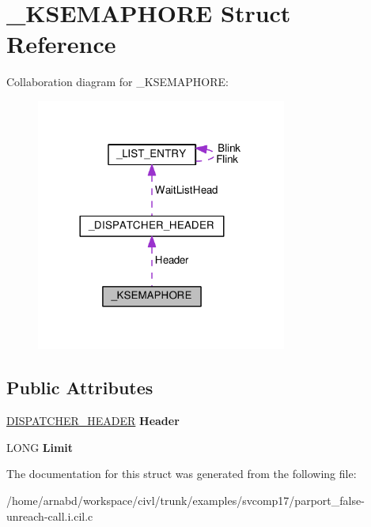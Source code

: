\hypertarget{struct__KSEMAPHORE}{}\section{\+\_\+\+K\+S\+E\+M\+A\+P\+H\+O\+R\+E Struct Reference}
\label{struct__KSEMAPHORE}


Collaboration diagram for \+\_\+\+K\+S\+E\+M\+A\+P\+H\+O\+R\+E\+:
\nopagebreak
\begin{figure}[H]
\begin{center}
\leavevmode
\includegraphics[width=233pt]{struct__KSEMAPHORE__coll__graph}
\end{center}
\end{figure}
\subsection*{Public Attributes}
\begin{DoxyCompactItemize}
\item 
\hypertarget{struct__KSEMAPHORE_aa6606e1b45d1d1fb1fb7c0e8de4806c9}{}\hyperlink{struct__DISPATCHER__HEADER}{D\+I\+S\+P\+A\+T\+C\+H\+E\+R\+\_\+\+H\+E\+A\+D\+E\+R} {\bfseries Header}\label{struct__KSEMAPHORE_aa6606e1b45d1d1fb1fb7c0e8de4806c9}

\item 
\hypertarget{struct__KSEMAPHORE_a08082bee4c31b7129d69deb26045bd17}{}L\+O\+N\+G {\bfseries Limit}\label{struct__KSEMAPHORE_a08082bee4c31b7129d69deb26045bd17}

\end{DoxyCompactItemize}


The documentation for this struct was generated from the following file\+:\begin{DoxyCompactItemize}
\item 
/home/arnabd/workspace/civl/trunk/examples/svcomp17/parport\+\_\+false-\/unreach-\/call.\+i.\+cil.\+c\end{DoxyCompactItemize}
